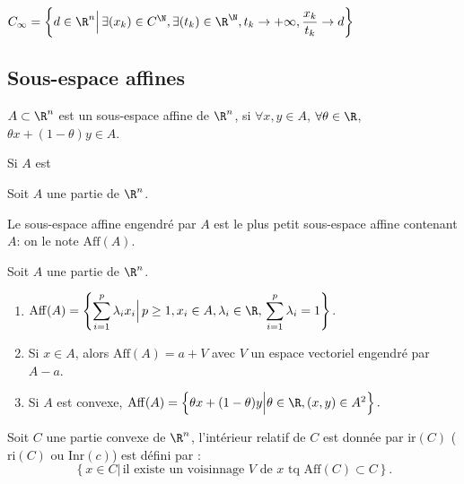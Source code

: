 \documentclass[12pt,a4paper]{article}
\begin{document}
	\begin{rmq}
		$C_\infty = \left\{d \in \R^n\Big|\, \exists(x_k) \in C^\N, \exists (t_k) \in \R^\N, t_k \to + \infty, \dfrac{x_k}{t_k} \to d\right\}$
	\end{rmq}	
	
	\subsection{Sous-espace affines}
	
	\begin{defi}
		\begin{minipage}{15cm}
			$A \subset \R^n$ est un sous-espace affine de $\R^n$, si $\forall x,y \in A$, $\forall \theta \in \R$, $\theta x+(1-\theta)y \in A$.
		\end{minipage}
	\end{defi}
	
	\begin{prop}
		Si $A$ est 
	\end{prop}
	
	\begin{defi}
		Soit $A$ une partie de $\R^n$.
		
		\begin{minipage}{18cm}
			Le sous-espace affine engendré par $A$ est le plus petit sous-espace affine contenant $A$: on le note $\mathrm{Aff}(A)$.
		\end{minipage}
	\end{defi}
	
	\begin{prop}
		Soit $A$ une partie de $\R^n$.\\
		\begin{minipage}{15cm}
			\begin{enumerate}
				\item $\mathrm{Aff}(A) = \left\{\displaystyle\sum_{i=1}^p \lambda_i x_i\Big|\, p\geq 1, x_i \in A, \lambda_i \in \R, \, \sum_{i=1}^p \lambda_i = 1\right\}$.
				\item Si $x \in A$, alors $\mathrm{Aff}(A) = a+V$ avec $V$ un espace vectoriel engendré par $A-a$.
				\item  Si $A$ est convexe, $\mathrm{Aff}(A) = \left\{\theta x + (1-\theta)y\Big| \theta \in \R, (x,y) \in A^2\right\}.$
			\end{enumerate}
		\end{minipage}
	\end{prop}
	
	\begin{defi}
		\begin{minipage}[t]{15cm}
			Soit $C$ une partie convexe de $\R^n$, l'intérieur relatif de $C$ est donnée par $\mathrm{ir}(C)$ ($\mathrm{ri}(C)$ ou $\mathrm{Inr}(c)$) est défini par :
			\[\left\{x \in C\Big|\,\text{il existe un voisinnage } V \text{ de } x \text{ tq } \mathrm{Aff}(C) \subset C\right\}.\]
		\end{minipage}
	\end{defi}
	
\end{document}
